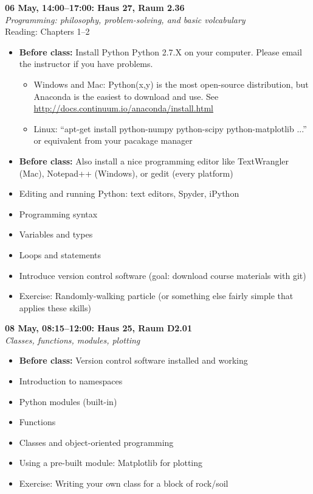 \documentclass[10pt,a4paper]{amsart}
\begin{document}
\begin{minipage}{\linewidth} 
\noindent \textbf{06 May, 14:00--17:00: Haus 27, Raum 2.36}\\
\textit{Programming: philosophy, problem-solving, and basic volcabulary}\\
Reading: Chapters 1--2
\begin{itemize}
 \item \textbf{Before class:} Install Python Python 2.7.X on your computer. Please email the instructor if you have problems.
 \begin{itemize}
  \item Windows and Mac: Python(x,y) is the most open-source distribution, but Anaconda is the easiest to download and use. See \url{http://docs.continuum.io/anaconda/install.html}
  \item Linux: ``apt-get install python-numpy python-scipy python-matplotlib ...'' or equivalent from your pacakage manager
 \end{itemize}
 \item \textbf{Before class:} Also install a nice programming editor like TextWrangler (Mac), Notepad++ (Windows), or gedit (every platform)
 \item Editing and running Python: text editors, Spyder, iPython
 \item Programming syntax
 \item Variables and types
 \item Loops and statements
 \item Introduce version control software (goal: download course materials with git)
 \item Exercise: Randomly-walking particle (or something else fairly simple that applies these skills)
\end{itemize}
\vspace{12pt}
\end{minipage}

\begin{minipage}{\linewidth}
\noindent \textbf{08 May, 08:15--12:00: Haus 25, Raum D2.01}\\
\textit{Classes, functions, modules, plotting}
\begin{itemize}
 \item \textbf{Before class:} Version control software installed and working
 \item Introduction to namespaces
 \item Python modules (built-in)
 \item Functions
 \item Classes and object-oriented programming
 \item Using a pre-built module: Matplotlib for plotting
 \item Exercise: Writing your own class for a block of rock/soil
\end{itemize}
\vspace{12pt}
\end{minipage}
\end{document}

